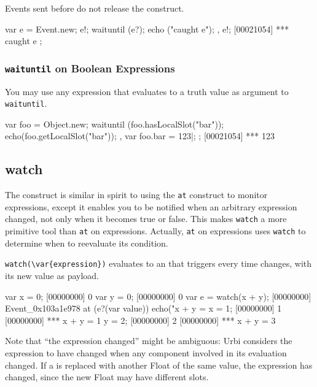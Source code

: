 Events sent before do not release the construct.

\begin{urbiscript}
{
  var e = Event.new;
  e!;
  {
    waituntil (e?);
    echo ("caught e");
  },
  e!;
[00021054] *** caught e
};
\end{urbiscript}

\subsubsection{\lstinline'waituntil' on Boolean Expressions}

You may use any expression that evaluates to a truth value as argument
to \lstinline'waituntil'.

\begin{urbiscript}
{
  var foo = Object.new;
  {
    waituntil (foo.hasLocalSlot("bar"));
    echo(foo.getLocalSlot("bar"));
  },
  var foo.bar = 123|;
};
[00021054] *** 123
\end{urbiscript}

\subsection{watch}
\label{sec:lang:watch}

The  construct is similar in spirit to using the
\lstinline|at| construct to monitor expressions, except it enables you to be
notified when an arbitrary expression changed, not only when it becomes true
or false. This makes \lstinline|watch| a more primitive tool than
\lstinline|at| on expressions.  Actually, \lstinline|at| on expressions uses
\lstinline|watch| to determine when to reevaluate its condition.

\lstinline|watch(\var{expression})| evaluates to an  that
triggers every time  changes, with its new value as payload.

\begin{urbiscript}[firstnumber=1]
var x = 0;
[00000000] 0
var y = 0;
[00000000] 0
var e = watch(x + y);
[00000000] Event_0x103a1e978
at (e?(var value))
  echo("x + y = %
x = 1;
[00000000] 1
[00000000] *** x + y = 1
y = 2;
[00000000] 2
[00000000] *** x + y = 3
\end{urbiscript}

Note that ``the expression changed'' might be ambiguous: Urbi considers the
expression to have changed when any component involved in its evaluation
changed.  If a  is replaced with another Float of the same
value, the expression has changed, since the new Float may have different
slots.

